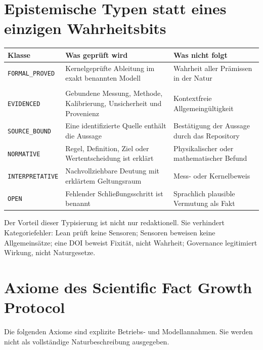 \documentclass[11pt,a4paper,oneside]{article}
\newcommand{\code}[1]{\texttt{#1}}
\begin{document}
\section{Epistemische Typen statt eines einzigen Wahrheitsbits}

\begin{longtable}{p{}p{}p{}}
\toprule
\textbf{Klasse} & \textbf{Was geprüft wird} & \textbf{Was nicht folgt}\\
\midrule
\endhead
\code{FORMAL\_PROVED} & Kernelgeprüfte Ableitung im exakt benannten Modell &
Wahrheit aller Prämissen in der Natur\\
\shortstack[l]{\texttt{EMPIRICALLY\_}\\\texttt{EVIDENCED}} & Gebundene Messung, Methode, Kalibrierung,
Unsicherheit und Provenienz & Kontextfreie Allgemeingültigkeit\\
\code{SOURCE\_BOUND} & Eine identifizierte Quelle enthält die Aussage &
Bestätigung der Aussage durch das Repository\\
\code{NORMATIVE} & Regel, Definition, Ziel oder Wertentscheidung ist erklärt &
Physikalischer oder mathematischer Befund\\
\code{INTERPRETATIVE} & Nachvollziehbare Deutung mit erklärtem Geltungsraum &
Mess- oder Kernelbeweis\\
\code{OPEN} & Fehlender Schließungsschritt ist benannt &
Sprachlich plausible Vermutung als Fakt\\
\bottomrule
\end{longtable}

Der Vorteil dieser Typisierung ist nicht nur redaktionell. Sie verhindert
Kategoriefehler: Lean prüft keine Sensoren; Sensoren beweisen keine
Allgemeinsätze; eine DOI beweist Fixität, nicht Wahrheit; Governance legitimiert
Wirkung, nicht Naturgesetze.

\section{Axiome des Scientific Fact Growth Protocol}

Die folgenden Axiome sind explizite Betriebs- und Modellannahmen. Sie werden
nicht als vollständige Naturbeschreibung ausgegeben.
\end{document}
